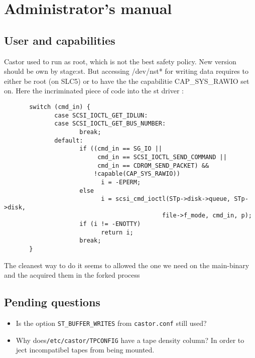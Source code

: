 
\chapter{Administrator's manual}
\section{User and capabilities}
Castor used to run as root, which is not the best safety policy. New version should be own by stage:st.
But accessing /dev/nst* for writing data requires to either be root (on SLC5) or to have the the capabilitie CAP\_SYS\_RAWIO set on. 
Here the incriminated piece of code into the st driver :
\begin{table}[h]
\begin{lstlisting}
       switch (cmd_in) {
              case SCSI_IOCTL_GET_IDLUN:
              case SCSI_IOCTL_GET_BUS_NUMBER:
                     break;
              default:
                     if ((cmd_in == SG_IO ||
                          cmd_in == SCSI_IOCTL_SEND_COMMAND ||
                          cmd_in == CDROM_SEND_PACKET) &&
                         !capable(CAP_SYS_RAWIO))
                           i = -EPERM;
                     else
                           i = scsi_cmd_ioctl(STp->disk->queue, STp->disk,
                                            file->f_mode, cmd_in, p);
                     if (i != -ENOTTY)
                           return i;
                     break;
       }
\end{lstlisting}
\end{table}

The cleanest way to do it seems to allowed the one we need on the main-binary and the acquired them in the forked process
\section{Pending questions}
\begin{itemize}
\item{}Is the option \verb#ST_BUFFER_WRITES# from \verb#castor.conf# still used?
\item{}Why does\verb#/etc/castor/TPCONFIG# have a tape density column? In order to ject incompatibel tapes from being mounted.
\end{itemize}

